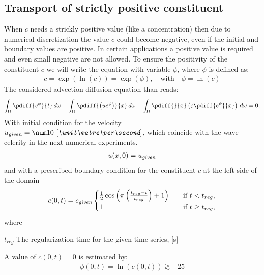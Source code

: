 \subsection{Transport of strictly positive constituent}
When $c$ needs a strickly positive value (like a concentration) then due to numerical discretization the value $c$ could become negative, even if the initial and boundary values are positive.
In certain applications a positive value is required and even small negative are not allowed.
To ensure the positivity of the constituent $c$ we will write the equation with variable $\phi$, where $\phi$ is defined as:
\begin{align}
    c = \exp(\ln(c)) =  \exp(\phi), \quad \text{with} \quad \phi = \ln(c)
\end{align}
The considered advection-diffusion equation than reads:
\begin{align}
    \int_\Omega\pdiff{{e^\phi}}{t} \, d\omega
    + \int_\Omega\pdiff{\left(u{e^\phi}\right)}{x} \, d\omega
    - \int_\Omega\pdiff{}{x}\left(\eps \pdiff{{e^\phi}}{x}\right)\, d\omega = 0,\label{eq:1d_advec_phi_num}
\end{align}
With initial condition for the velocity $u_{\it given} = \bqty{10}{\metre\per\second}$, which coincide with the wave celerity in the next numerical experiments.
\begin{align}
    u(x,0) = u_{\it given}
\end{align}
and with a prescribed boundary condition for the constituent $c$ at the left side of the domain
\begin{align}
    c(0,t) = c_{\it given}
    \begin{cases}
        \frac{1}{2} \cos\left(\pi \left(\frac{t_{reg} - t}{t_{reg}}\right)+ 1\right) &\quad \text{if } t < t_{reg},
        \\
        1 &\quad \text{if } t \geq t_{reg},
    \end{cases}
\end{align}
where
\begin{symbollist}
    \item[$t_{reg}$] The regularization time for the given time-series, [\si{\second}]
\end{symbollist}
A value of $c(0,t)=0$ is estimated by:
\begin{align}
    \phi(0,t) = \ln(c(0,t)) \gtrsim -25
\end{align}

